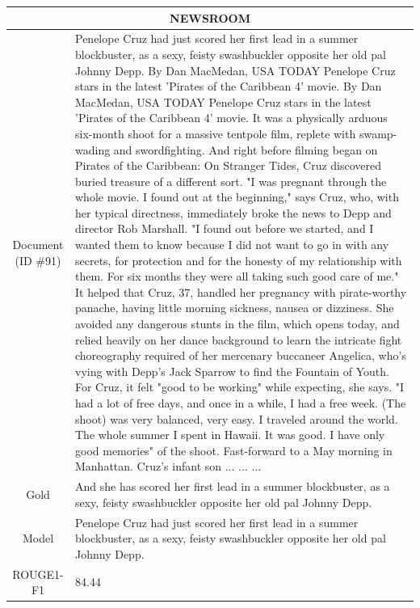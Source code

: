 \begin{table}[bth!]
\scriptsize
\centering
\renewcommand{\arraystretch}{1.3}
\begin{tabular}{c|p{}}
\hline
\multicolumn{2}{c}{NEWSROOM} \\ \hline
\makecell{Document\\(ID \#91)} & 
Penelope Cruz had just scored her first lead in a summer blockbuster, as a sexy, feisty swashbuckler opposite her old pal Johnny Depp. By Dan MacMedan, USA TODAY Penelope Cruz stars in the latest 'Pirates of the Caribbean 4' movie. By Dan MacMedan, USA TODAY Penelope Cruz stars in the latest 'Pirates of the Caribbean 4' movie. It was a physically arduous six-month shoot for a massive tentpole film, replete with swamp-wading and swordfighting. And right before filming began on Pirates of the Caribbean: On Stranger Tides, Cruz discovered buried treasure of a different sort. "I was pregnant through the whole movie. I found out at the beginning," says Cruz, who, with her typical directness, immediately broke the news to Depp and director Rob Marshall. "I found out before we started, and I wanted them to know because I did not want to go in with any secrets, for protection and for the honesty of my relationship with them. For six months they were all taking such good care of me." It helped that Cruz, 37, handled her pregnancy with pirate-worthy panache, having little morning sickness, nausea or dizziness. She avoided any dangerous stunts in the film, which opens today, and relied heavily on her dance background to learn the intricate fight choreography required of her mercenary buccaneer Angelica, who's vying with Depp's Jack Sparrow to find the Fountain of Youth. For Cruz, it felt "good to be working" while expecting, she says. "I had a lot of free days, and once in a while, I had a free week. (The shoot) was very balanced, very easy. I traveled around the world. The whole summer I spent in Hawaii. It was good. I have only good memories" of the shoot. Fast-forward to a May morning in Manhattan. Cruz's infant son ... ... ... 
\\ \hline
Gold & 
And she has scored her first lead in a summer blockbuster, as a sexy, feisty swashbuckler opposite her old pal Johnny Depp.
\\ \hline
Model & 
Penelope Cruz had just scored her first lead in a summer blockbuster, as a sexy, feisty swashbuckler opposite her old pal Johnny Depp.
\\ \hline
ROUGE1-F1 & 
84.44
\\ \hline

\end{tabular}
\end{table}
